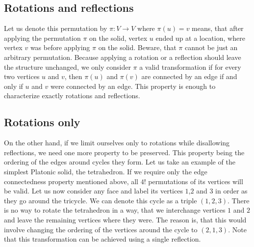 \begin{highlight}
\subsection{Rotations and reflections}

Let us denote this permutation by $\pi : V \rightarrow V$ where $\pi(u) = v$ means, that after applying the permutation $\pi$ on the solid, vertex $u$ ended up at a location, where vertex $v$ was before applying $\pi$ on the solid. Beware, that $\pi$ cannot be just an arbitrary permutation. Because applying a rotation or a reflection should leave the structure unchanged, we only consider $\pi$ a valid transformation if for every two vertices $u$ and $v$, then $\pi(u)$ and $\pi(v)$ are connected by an edge if and only if $u$ and $v$ were connected by an edge. This property is enough to characterize exactly rotations and reflections.

\subsection{Rotations only}

On the other hand, if we limit ourselves only to rotations while disallowing reflections, we need one more property to be preserved. This property being the ordering of the edges around cycles they form. Let us take an example of the simplest Platonic solid, the tetrahedron. If we require only the edge connectedness property mentioned above, all $4!$ permutations of its vertices will be valid. Let us now consider any face and label its vertices $1$,$2$ and $3$ in order as they go around the tricycle. We can denote this cycle as a triple $(1,2,3)$. There is no way to rotate the tetrahedron in a way, that we interchange vertices $1$ and $2$ and leave the remaining vertices where they were. The reason is, that this would involve changing the ordering of the vertices around the cycle to $(2,1,3)$. Note that this transformation can be achieved using a single reflection.

\end{highlight}